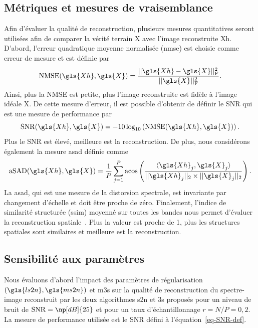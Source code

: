 \subsection{Métriques et mesures de vraisemblance}\label{sec-metriques}

Afin d'évaluer la qualité de reconstruction, plusieurs mesures quantitatives seront utilisées afin de comparer la vérité terrain \gls{X} avec l'image reconstruite \gls{Xh}. D'abord, l'erreur quadratique moyenne normalisée (\gls{nmse}) est choisie comme erreur de mesure et est définie par
\begin{equation}
    \mathrm{NMSE}(\gls{Xh}, \gls{X}) = \frac{\frobnorm{\gls{Xh} - \gls{X}}}{\frobnorm{\gls{X}}}.
\end{equation}
Ainsi, plus la NMSE est petite, plus l'image reconstruite est fidèle à l'image idéale \gls{X}. De cette mesure d'erreur, il est possible d'obtenir de définir le SNR qui est une mesure de performance par
\begin{equation}\label{eq-SNR-def}
\mathrm{SNR}(\gls{Xh}, \gls{X}) = -10\log_{10}\left( \mathrm{NMSE}(\gls{Xh}, \gls{X}) \right).
\end{equation}
Plus le SNR est élevé, meilleure est la reconstruction. De plus, nous considérons également la mesure \gls{asad} définie comme~\cite{keshava2004distance,sohn2002supervised}
\begin{equation}\label{eq-aSAD-def}
\mathrm{aSAD}(\gls{Xh},\gls{X}) = \frac{1}{P}\sum_{j=1}^{P}\mathrm{acos}\left(
\frac
{\langle\gls{Xh}_j, \gls{X}_j\rangle}
{||\gls{Xh}_j||_2\times||\gls{X}_j||_2}
\right).
\end{equation}
La \gls{asad}, qui est une mesure de la distorsion spectrale, est invariante par changement d'échelle et doit être proche de zéro. Finalement, l'indice de similarité structurée (\gls{ssim}) moyenné sur toutes les bandes nous permet d'évaluer la reconstruction spatiale~\cite{wang2009mean,wang2004image}. Plus la valeur est proche de 1, plus les structures spatiales sont similaires et meilleure est la reconstruction.


\subsection{Sensibilité aux paramètres}\label{sec-lr-param-tuning}

Nous évaluons d'abord l'impact des paramètres de régularisation $(\gls{ls2n}, \gls{ms2n})$ et \gls{m3s} sur la qualité de reconstruction du spectre-image reconstruit par les deux algorithmes \gls{s2n} et \gls{3s} proposés pour un niveau de bruit de $\mathrm{SNR} = \np[dB]{25}$ et pour un taux d'échantillonnage $r=N/P=0,2$. La mesure de performance utilisée est le SNR défini à l'équation~\eqref{eq-SNR-def}.

